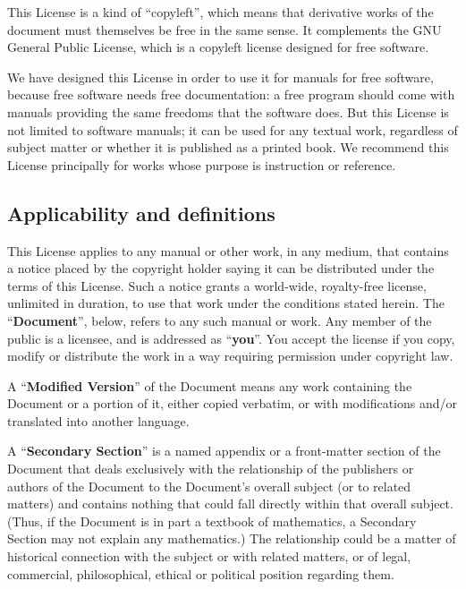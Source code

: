 \documentclass[letterpaper,twoside]{scrartcl}
\begin{document}
   This License is a kind of ``copyleft'', which means that derivative
   works of the document must themselves be free in the same sense.  It
   complements the GNU General Public License, which is a copyleft
   license designed for free software.

   We have designed this License in order to use it for manuals for free
   software, because free software needs free documentation: a free
   program should come with manuals providing the same freedoms that the
   software does.  But this License is not limited to software manuals;
   it can be used for any textual work, regardless of subject matter or
   whether it is published as a printed book.  We recommend this License
   principally for works whose purpose is instruction or reference.


   

   
   \subsection{Applicability and definitions}
   

   This License applies to any manual or other work, in any medium, that
   contains a notice placed by the copyright holder saying it can be
   distributed under the terms of this License.  Such a notice grants a
   world-wide, royalty-free license, unlimited in duration, to use that
   work under the conditions stated herein.  The ``\textbf{Document}'', below,
   refers to any such manual or work.  Any member of the public is a
   licensee, and is addressed as ``\textbf{you}''.  You accept the license if you
   copy, modify or distribute the work in a way requiring permission
   under copyright law.

   A ``\textbf{Modified Version}'' of the Document means any work containing the
   Document or a portion of it, either copied verbatim, or with
   modifications and/or translated into another language.

   A ``\textbf{Secondary Section}'' is a named appendix or a front-matter section of
   the Document that deals exclusively with the relationship of the
   publishers or authors of the Document to the Document's overall subject
   (or to related matters) and contains nothing that could fall directly
   within that overall subject.  (Thus, if the Document is in part a
   textbook of mathematics, a Secondary Section may not explain any
   mathematics.)  The relationship could be a matter of historical
   connection with the subject or with related matters, or of legal,
   commercial, philosophical, ethical or political position regarding
   them.
\end{document}
